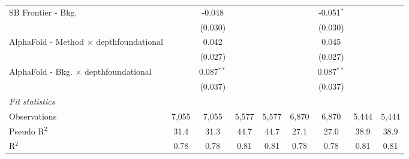 \begin{tabular}{lcccccccc}
   SB Frontier - Bkg.                             &               & -0.048        &       &       &               & -0.051$^{*}$  &       &   \\   
                                                  &               & (0.030)       &       &       &               & (0.030)       &       &   \\   
   AlphaFold - Method $\times$ depthfoundational  &               & 0.042         &       &       &               & 0.045         &       &   \\   
                                                  &               & (0.027)       &       &       &               & (0.027)       &       &   \\   
   AlphaFold - Bkg. $\times$ depthfoundational    &               & 0.087$^{**}$  &       &       &               & 0.087$^{**}$  &       &   \\   
                                                  &               & (0.037)       &       &       &               & (0.037)       &       &   \\   
   \midrule
   \emph{Fit statistics}\\
   Observations                                   & 7,055         & 7,055         & 5,577 & 5,577 & 6,870         & 6,870         & 5,444 & 5,444\\  
   Pseudo R$^2$                                   & 31.4          & 31.3          & 44.7  & 44.7  & 27.1          & 27.0          & 38.9  & 38.9\\  
   R$^2$                                          & 0.78          & 0.78          & 0.81  & 0.81  & 0.78          & 0.78          & 0.81  & 0.81\\  
   

\end{tabular}
